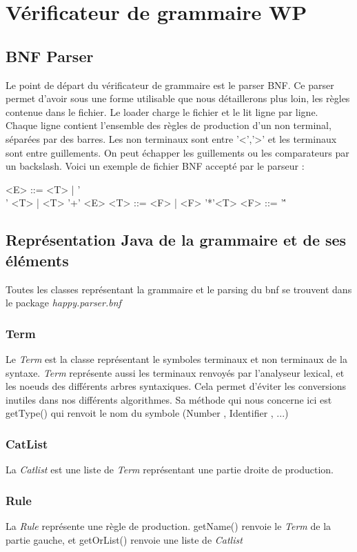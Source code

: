 \chapter{Vérificateur de grammaire WP}
	\section{BNF Parser}
	Le point de départ du vérificateur de grammaire est le parser BNF. Ce parser permet d'avoir sous une forme utilisable que nous détaillerons 
plus loin, les règles contenue dans le fichier. Le loader charge le fichier et le lit ligne par ligne. Chaque ligne contient l'ensemble des règles
de production d'un non terminal, séparées par des barres. Les non terminaux sont entre '<','>' et les terminaux sont entre guillements. On peut
échapper les guillements ou les comparateurs par un backslash. 
Voici un exemple de fichier BNF accepté par le parseur : 

\begin{verbatim*}
	  <E> ::= <T> | '\\' <T> | <T> '+' <E>
	  <T> ::= <F> | <F> '*'<T>
	  <F> ::= '\''
\end{verbatim*}

	\section{Représentation Java de la grammaire et de ses éléments}
		Toutes les classes représentant la grammaire et le parsing du bnf se trouvent dans le package \emph{happy.parser.bnf}
		\subsection{Term} Le \emph{Term} est la classe représentant le symboles terminaux et non terminaux de la syntaxe. \emph{Term}
		représente aussi les terminaux renvoyés par l'analyseur lexical, et les noeuds des différents arbres syntaxiques. Cela permet d'éviter
		les conversions inutiles dans nos différents algorithmes. Sa méthode qui nous concerne ici est getType() qui renvoit le nom du symbole
		(Number , Identifier , ...)
		\subsection{CatList} La \emph{Catlist} est une liste de \emph{Term} représentant une partie droite de production. 
		\subsection{Rule}  La \emph{Rule} représente une règle de production. getName() renvoie le \emph{Term} de la partie gauche, 
		et getOrList() renvoie une liste de \emph{Catlist}

